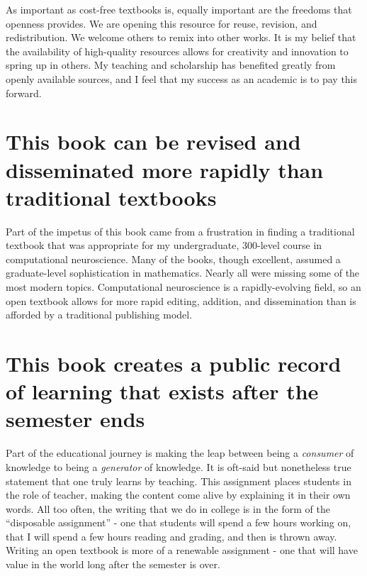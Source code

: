 \documentclass[
]{book}
\begin{document}
As important as cost-free textbooks is, equally important are the freedoms that openness provides. We are opening this resource for reuse, revision, and redistribution. We welcome others to remix into other works. It is my belief that the availability of high-quality resources allows for creativity and innovation to spring up in others. My teaching and scholarship has benefited greatly from openly available sources, and I feel that my success as an academic is to pay this forward.

\hypertarget{this-book-can-be-revised-and-disseminated-more-rapidly-than-traditional-textbooks}{%
\section{This book can be revised and disseminated more rapidly than traditional textbooks}\label{this-book-can-be-revised-and-disseminated-more-rapidly-than-traditional-textbooks}}

Part of the impetus of this book came from a frustration in finding a traditional textbook that was appropriate for my undergraduate, 300-level course in computational neuroscience. Many of the books, though excellent, assumed a graduate-level sophistication in mathematics. Nearly all were missing some of the most modern topics. Computational neuroscience is a rapidly-evolving field, so an open textbook allows for more rapid editing, addition, and dissemination than is afforded by a traditional publishing model.

\hypertarget{this-book-creates-a-public-record-of-learning-that-exists-after-the-semester-ends}{%
\section{This book creates a public record of learning that exists after the semester ends}\label{this-book-creates-a-public-record-of-learning-that-exists-after-the-semester-ends}}

Part of the educational journey is making the leap between being a \emph{consumer} of knowledge to being a \emph{generator} of knowledge. It is oft-said but nonetheless true statement that one truly learns by teaching. This assignment places students in the role of teacher, making the content come alive by explaining it in their own words. All too often, the writing that we do in college is in the form of the ``disposable assignment'' - one that students will spend a few hours working on, that I will spend a few hours reading and grading, and then is thrown away. Writing an open textbook is more of a renewable assignment - one that will have value in the world long after the semester is over.
\end{document}
